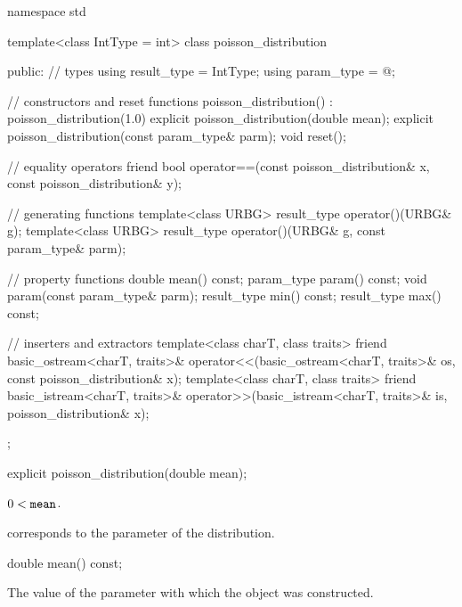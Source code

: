 %
%
\begin{codeblock}
namespace std {
  template<class IntType = int>
  class poisson_distribution {
  public:
    // types
    using result_type = IntType;
    using param_type  = @\unspec@;

    // constructors and reset functions
    poisson_distribution() : poisson_distribution(1.0) {}
    explicit poisson_distribution(double mean);
    explicit poisson_distribution(const param_type& parm);
    void reset();

    // equality operators
    friend bool operator==(const poisson_distribution& x, const poisson_distribution& y);

    // generating functions
    template<class URBG>
      result_type operator()(URBG& g);
    template<class URBG>
      result_type operator()(URBG& g, const param_type& parm);

    // property functions
    double mean() const;
    param_type param() const;
    void param(const param_type& parm);
    result_type min() const;
    result_type max() const;

    // inserters and extractors
    template<class charT, class traits>
      friend basic_ostream<charT, traits>&
        operator<<(basic_ostream<charT, traits>& os, const poisson_distribution& x);
    template<class charT, class traits>
      friend basic_istream<charT, traits>&
        operator>>(basic_istream<charT, traits>& is, poisson_distribution& x);
  };
}
\end{codeblock}

%
\begin{itemdecl}
explicit poisson_distribution(double mean);
\end{itemdecl}

\begin{itemdescr}
\pnum
\expects
$0 < \texttt{\protect mean}$.

\pnum
\remarks
{} corresponds to the parameter of the distribution.
\end{itemdescr}

%
\begin{itemdecl}
double mean() const;
\end{itemdecl}

\begin{itemdescr}
\pnum
\returns
The value of the  parameter
 with which the object was constructed.
\end{itemdescr}

